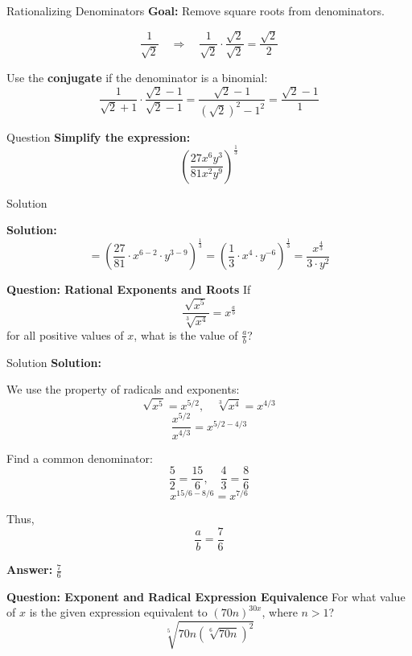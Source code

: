 \documentclass{beamer}
\begin{document}
\begin{frame}{Rationalizing Denominators}
\textbf{Goal:} Remove square roots from denominators.

\[
\dfrac{1}{\sqrt{2}} \quad \Rightarrow \quad \dfrac{1}{\sqrt{2}} \cdot \dfrac{\sqrt{2}}{\sqrt{2}} = \dfrac{\sqrt{2}}{2}
\]

\vspace{0.3cm}
Use the \textbf{conjugate} if the denominator is a binomial:
\[
\dfrac{1}{\sqrt{2} + 1} \cdot \dfrac{\sqrt{2} - 1}{\sqrt{2} - 1} = \dfrac{\sqrt{2} - 1}{(\sqrt{2})^2 - 1^2} = \dfrac{\sqrt{2} - 1}{1}
\]
\end{frame}

\begin{frame}{Question}
\textbf{Simplify the expression:}
\[
\left( \dfrac{27x^6 y^3}{81x^2 y^9} \right)^{\frac{1}{3}}
\]

\end{frame}

\begin{frame}{Solution}
    

\textbf{Solution:}
\[
= \left( \dfrac{27}{81} \cdot x^{6-2} \cdot y^{3-9} \right)^{\frac{1}{3}} 
= \left( \dfrac{1}{3} \cdot x^4 \cdot y^{-6} \right)^{\frac{1}{3}} 
= \dfrac{x^{\frac{4}{3}}}{3 \cdot y^2}
\]
\end{frame}

\begin{frame}{\textbf{Question: Rational Exponents and Roots}}
If 
\[
\frac{\sqrt{x^5}}{\sqrt[3]{x^4}} = x^{\frac{a}{b}}
\]
for all positive values of \( x \), what is the value of \( \frac{a}{b} \)?

\end{frame}

\begin{frame}{Solution}
\textbf{Solution:}

We use the property of radicals and exponents:
\[
\sqrt{x^5} = x^{5/2}, \quad \sqrt[3]{x^4} = x^{4/3}
\]
\[
\frac{x^{5/2}}{x^{4/3}} = x^{5/2 - 4/3}
\]

Find a common denominator:
\[
\frac{5}{2} = \frac{15}{6}, \quad \frac{4}{3} = \frac{8}{6}
\]
\[
x^{15/6 - 8/6} = x^{7/6}
\]

Thus,
\[
\frac{a}{b} = \frac{7}{6}
\]

\textbf{Answer:} \( \boxed{\frac{7}{6}} \)
    
\end{frame}


\begin{frame}{\textbf{Question: Exponent and Radical Expression Equivalence}}
For what value of \( x \) is the given expression equivalent to \( (70n)^{30x} \), where \( n > 1 \)?
\[
\sqrt[5]{70n \left( \sqrt[6]{70n} \right)^2}
\]
\end{frame}
\end{document}
